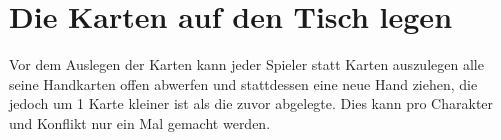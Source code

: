 \section{Die Karten auf den Tisch legen}
Vor dem Auslegen der Karten kann jeder Spieler statt Karten auszulegen alle seine Handkarten offen abwerfen und stattdessen eine neue Hand ziehen, die jedoch um 1 Karte kleiner ist als die zuvor abgelegte. Dies kann pro Charakter und Konflikt nur ein Mal gemacht werden.
